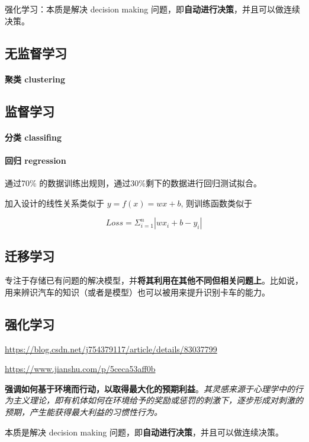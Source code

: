 \documentclass[UTF8,a4paper,12pt]{ctexbook}
\begin{document}
		强化学习：本质是解决 decision making 问题，即\textbf{自动进行决策}，并且可以做连续决策。
	
		\subsection{无监督学习}
			\paragraph{聚类 clustering}
			
		
		\subsection{监督学习}
			\paragraph{分类 classifing}
		
		
			\paragraph{回归 regression}
				通过70\% 的数据训练出规则，通过30\%剩下的数据进行回归测试拟合。	
				
				加入设计的线性关系类似于 $ y = f(x) = wx + b$, 则训练函数类似于
				
				$$ Loss = \Sigma_{i=1}^{n}|wx_i + b - y_i|$$		
		
		
		\subsection{迁移学习}
			专注于存储已有问题的解决模型，并\textbf{将其利用在其他不同但相关问题上}。比如说，用来辨识汽车的知识（或者是模型）也可以被用来提升识别卡车的能力。
		
		\subsection{强化学习}
			\url{https://blog.csdn.net/j754379117/article/details/83037799}
			
			\url{https://www.jianshu.com/p/5ceca53aff0b}
			
			
			\textbf{强调如何基于环境而行动，以取得最大化的预期利益}。\textit{其灵感来源于心理学中的行为主义理论，即有机体如何在环境给予的奖励或惩罚的刺激下，逐步形成对刺激的预期，产生能获得最大利益的习惯性行为。}
			
			本质是解决 decision making 问题，即\textbf{自动进行决策}，并且可以做连续决策。
			
\end{document}
